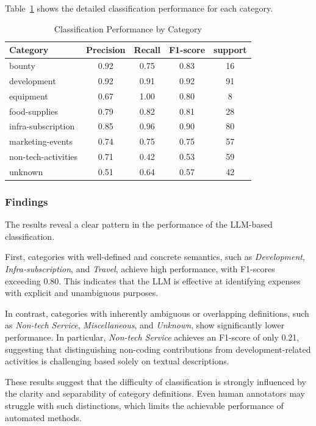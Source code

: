 \documentclass[11pt]{ist-thesis-lt}
\begin{document}
Table~\ref{tab:classification-results} shows the detailed classification performance for each category.

\begin{table}[htbp]
\centering
\caption{Classification Performance by Category}
\label{tab:classification-results}
\begin{tabular}{lcccc}
\toprule
Category & Precision & Recall & F1-score & support \\
\midrule
bounty & 0.92 & 0.75 & 0.83 & 16 \\
development & 0.92 & 0.91 & 0.92 & 91 \\
equipment & 0.67 & 1.00 & 0.80 & 8 \\
food-supplies & 0.79 & 0.82 & 0.81 & 28 \\
infra-subscription & 0.85 & 0.96 & 0.90 & 80 \\
marketing-events & 0.74 & 0.75 & 0.75 & 57 \\
non-tech-activities & 0.71 & 0.42 & 0.53 & 59 \\
unknown & 0.51 & 0.64 & 0.57 & 42 \\
\bottomrule
\end{tabular}
\end{table}

\subsubsection{Findings}

The results reveal a clear pattern in the performance of the LLM-based classification.

First, categories with well-defined and concrete semantics, such as \textit{Development}, \textit{Infra-subscription}, and \textit{Travel}, achieve high performance, with F1-scores exceeding 0.80. This indicates that the LLM is effective at identifying expenses with explicit and unambiguous purposes.

In contrast, categories with inherently ambiguous or overlapping definitions, such as \textit{Non-tech Service}, \textit{Miscellaneous}, and \textit{Unknown}, show significantly lower performance. In particular, \textit{Non-tech Service} achieves an F1-score of only 0.21, suggesting that distinguishing non-coding contributions from development-related activities is challenging based solely on textual descriptions.

These results suggest that the difficulty of classification is strongly influenced by the clarity and separability of category definitions. Even human annotators may struggle with such distinctions, which limits the achievable performance of automated methods.
\end{document}
